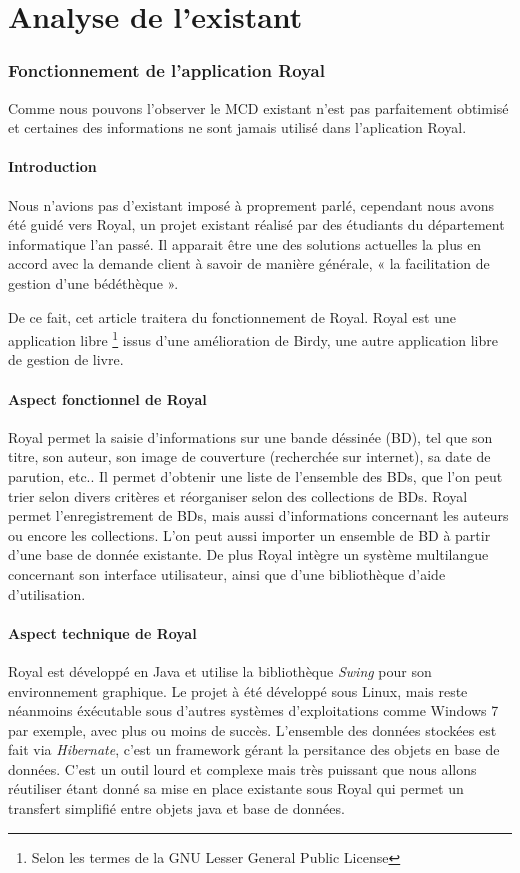 \part{Analyse de l'existant}


\section{Fonctionnement de l'application Royal}

Comme nous pouvons l'observer le MCD existant n'est pas parfaitement obtimisé et certaines des informations ne sont jamais utilisé dans l'aplication Royal. 

\subsection{Introduction}
Nous n'avions pas d'existant imposé à proprement parlé, cependant nous avons été guidé vers Royal, un projet existant réalisé par des étudiants du département informatique l'an passé.
Il apparait être une des solutions actuelles la plus en accord avec la demande client à savoir de manière générale, « la facilitation de gestion d'une bédéthèque ».

De ce fait, cet article traitera du fonctionnement de Royal.
Royal est une application 
libre \footnote{Selon les termes de la GNU Lesser General Public License}
issus d'une amélioration de Birdy, une autre application libre de gestion de livre.

\subsection{Aspect fonctionnel de Royal}
Royal permet la saisie d'informations sur une bande déssinée (BD), tel que son titre, son auteur, son image de couverture (recherchée sur internet), sa date de parution, etc..
Il permet d'obtenir une liste de l'ensemble des BDs, que l'on peut trier selon divers critères et réorganiser selon des collections de BDs.
Royal permet l'enregistrement de BDs, mais aussi d'informations concernant les auteurs ou encore les collections.
L'on peut aussi importer un ensemble de BD à partir d'une base de donnée existante.
De plus Royal intègre un système multilangue concernant son interface utilisateur, ainsi que d'une bibliothèque d'aide d'utilisation.

\subsection{Aspect technique de Royal}
Royal est développé en Java et utilise la bibliothèque \emph{Swing} pour son environnement graphique. 
Le projet à été développé sous Linux, mais reste néanmoins éxécutable sous d'autres systèmes d'exploitations comme Windows 7 par exemple, avec plus ou moins de succès. 
L'ensemble des données stockées est fait via \emph{Hibernate}, c'est un framework gérant la persitance des objets en base de données. 
C'est un outil lourd et complexe mais très puissant que nous allons réutiliser étant donné sa mise en place existante sous Royal qui permet un transfert simplifié entre objets java et base de données.

